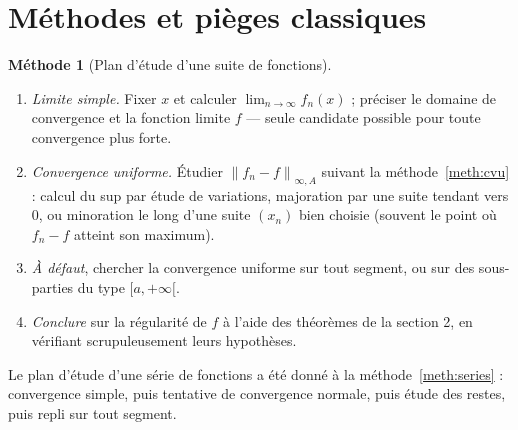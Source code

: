 \documentclass[11pt,a4paper]{article}
\theoremstyle{plain}
\theoremstyle{definition}
\newtheorem{methode}[theoreme]{Méthode}
\theoremstyle{remark}
\newcommand{\Ninf}[2]{\left\lVert #1 \right\rVert_{\infty,#2}}
\numberwithin{equation}{section}
\begin{document}
\section{Méthodes et pièges classiques}

\begin{methode}[Plan d'étude d'une suite de fonctions]
\begin{enumerate}
    \item \emph{Limite simple.} Fixer $x$ et calculer
    $\lim_{n\to\infty}f_n(x)$ ; préciser le domaine de convergence et la
    fonction limite $f$ --- seule candidate possible pour toute
    convergence plus forte.
    \item \emph{Convergence uniforme.} Étudier
    $\Ninf{f_n-f}{A}$ suivant la méthode~\ref{meth:cvu} : calcul du sup
    par étude de variations, majoration par une suite tendant vers $0$,
    ou minoration le long d'une suite $(x_n)$ bien choisie (souvent le
    point où $f_n-f$ atteint son maximum).
    \item \emph{À défaut}, chercher la convergence uniforme sur tout
    segment, ou sur des sous-parties du type $[a,+\infty[$.
    \item \emph{Conclure} sur la régularité de $f$ à l'aide des théorèmes
    de la section 2, en vérifiant scrupuleusement leurs hypothèses.
\end{enumerate}
\end{methode}

Le plan d'étude d'une série de fonctions a été donné à la
méthode~\ref{meth:series} : convergence simple, puis tentative de
convergence normale, puis étude des restes, puis repli sur tout segment.
\end{document}
